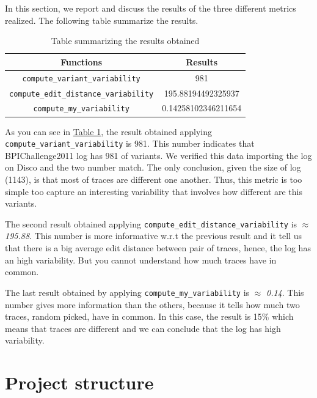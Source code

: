 \documentclass[12pt]{article}
\begin{document}
In this section, we report and discuss the results of the three different metrics realized. The following table summarize the results.
\renewcommand{\arraystretch}{1.5}\\
\begin{table}[H]
	\centering
		\begin{tabular}{ |c|c|  }
			\hline
			\textbf{Functions} & \textbf{Results }\\
			\hline
			\texttt{compute\_variant\_variability} & 981 \\ \hline
			\texttt{compute\_edit\_distance\_variability} & 195.88194492325937 \\ \hline
			\texttt{compute\_my\_variability} & 0.14258102346211654 \\
			\hline
		\end{tabular}
	\caption{Table summarizing the results obtained}
	\label{table:results}
\end{table}

As you can see in \hyperref[table:results]{Table 1}, the result obtained applying \texttt{compute\_variant\_variability} is 981. This number indicates that BPIChallenge2011 log has 981 of variants. We verified this data importing the log on Disco and the two number match. The only conclusion, given the size of log (1143), is that most of traces are different one another. Thus, this metric is too simple too capture an interesting variability that involves how different are this variants.

\smallskip  

The second result obtained applying \texttt{compute\_edit\_distance\_variability} is $\approx$ \textit{195.88}. This number is more informative w.r.t the previous result and it tell us that there is a big average edit distance between pair of traces, hence, the log has an high variability. But you cannot understand how much traces have in common.

\smallskip

The last result obtained by applying \texttt{compute\_my\_variability} is $\approx$ \textit{0.14}. This number gives more information than the others, because it tells how much two traces, random picked, have in common. In this case, the result is 15\% which means that traces are different and we can conclude that the log has high variability.
\newpage
\section*{Project structure}\label{section:structure}
\end{document}
